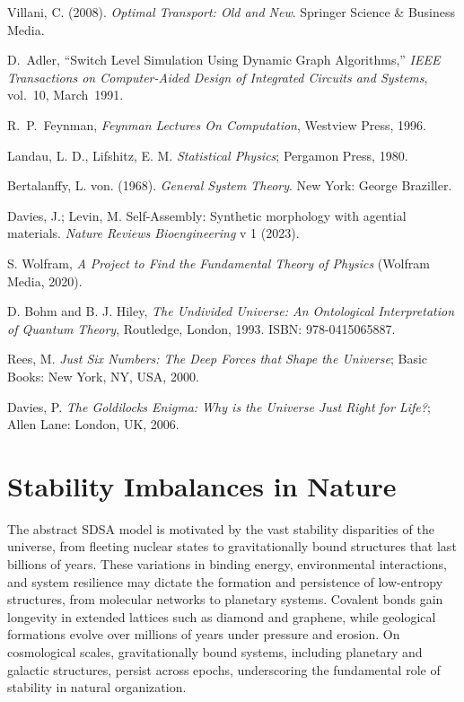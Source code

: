 \documentclass[preprint,12pt]{elsarticle}
\begin{document}
\begin{thebibliography}{999}
Villani, C. (2008). \textit{Optimal Transport: Old and New}. Springer Science \& Business Media.


 D.~Adler, ``Switch Level Simulation Using Dynamic Graph Algorithms,''
{\em IEEE Transactions on Computer-Aided Design of Integrated Circuits and Systems}, vol.~10, March~1991.

R.~P.~Feynman, {\em Feynman Lectures On Computation}, Westview Press, 1996.

Landau, L. D., Lifshitz, E. M. \textit{Statistical Physics}; Pergamon Press, 1980.

Bertalanffy, L. von. (1968). \textit{General System Theory}. New York: George Braziller.

Davies, J.; Levin, M. Self-Assembly: Synthetic morphology with agential materials. \textit{Nature Reviews Bioengineering} v 1 (2023).

 S. Wolfram, \textit{A Project to Find the Fundamental Theory of Physics} (Wolfram Media, 2020).

D. Bohm and B. J. Hiley, \emph{The Undivided Universe: An Ontological Interpretation of Quantum Theory}, Routledge, London, 1993. ISBN: 978-0415065887.

Rees, M. \textit{Just Six Numbers: The Deep Forces that Shape the Universe}; Basic Books: New York, NY, USA, 2000.

Davies, P. \textit{The Goldilocks Enigma: Why is the Universe Just Right for Life?}; Allen Lane: London, UK, 2006.


\end{thebibliography}


\appendix

\section{Stability Imbalances in Nature}

The abstract SDSA model is motivated by the vast stability disparities of the universe, from fleeting nuclear states to gravitationally bound structures that last billions of years. These variations in binding energy, environmental interactions, and system resilience may dictate the formation and persistence of low-entropy structures, from molecular networks to planetary systems. Covalent bonds gain longevity in extended lattices such as diamond and graphene, while geological formations evolve over millions of years under pressure and erosion. On cosmological scales, gravitationally bound systems, including planetary and galactic structures, persist across epochs, underscoring the fundamental role of stability in natural organization.
\end{document}
